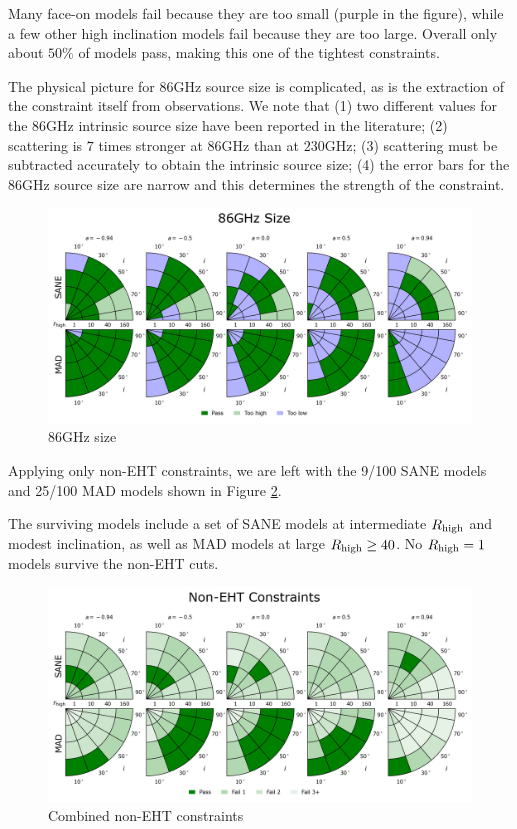 Many face-on models fail because they are too small (purple in the figure), while a few other high inclination models fail because they are too large.  Overall only about $50\%$ of models pass, making this one of the tightest constraints.

The physical picture for 86GHz source size is complicated, as is the extraction of the constraint itself from observations.  We note that (1) two different values for the 86GHz intrinsic source size have been reported in the literature; (2) scattering is $7$ times stronger at $86$GHz than at $230$GHz; (3) scattering must be subtracted accurately to obtain the intrinsic source size; (4) the error bars for the 86GHz source size are narrow and this determines the strength of the constraint.

\begin{figure}
  \centering
  \includegraphics[width=\columnwidth]{./figures/86GHz_size_Constraints.png}
  \caption{86GHz size}
  \label{fig:cmp_86ghz_size}
\end{figure}


Applying only non-EHT constraints, we are left with the 9/100 SANE models and 25/100 MAD models shown in Figure \ref{fig:non_eht_cuts}.

The surviving models include a set of SANE models at intermediate $R_\mathrm{high}$ and modest inclination, as well as MAD models at large $R_\mathrm{high} \ge 40$.  No $R_\mathrm{high} = 1$ models survive the non-EHT cuts.

\begin{figure}
  \centering
  \includegraphics[width=\columnwidth]{./figures/Non_Interferometric_Constraints.png}
  \caption{Combined non-EHT constraints}
  \label{fig:non_eht_cuts}
\end{figure}

